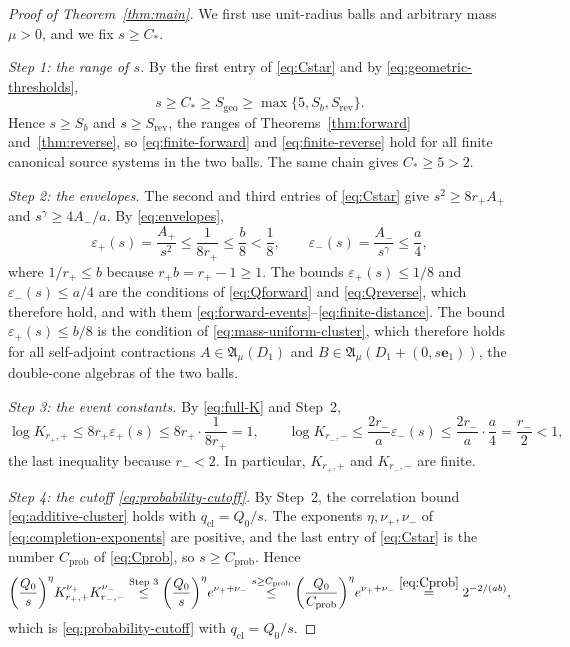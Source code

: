 \documentclass[11pt]{amsart}
\numberwithin{equation}{section}
\theoremstyle{definition}
\newcommand{\A}{\mathfrak A}
\newcommand{\eone}{\mathbf e_1}
\begin{document}
\begin{proof}[Proof of Theorem~\ref{thm:main}]
We first use unit-radius balls and arbitrary mass \(\mu>0\), and we fix
\(s\ge C_*\).

\smallskip
\emph{Step 1: the range of \(s\).} By the first entry of
\eqref{eq:Cstar} and by \eqref{eq:geometric-thresholds},
\[
 s\ge C_*\ge S_{\mathrm{geo}}\ge\max\{5,S_b,S_{\mathrm{rev}}\}.
\]
Hence \(s\ge S_b\) and \(s\ge S_{\mathrm{rev}}\), the ranges of
Theorems~\ref{thm:forward} and~\ref{thm:reverse}, so
\eqref{eq:finite-forward} and \eqref{eq:finite-reverse} hold for all
finite canonical source systems in the two balls. The same chain gives
\(C_*\ge5>2\).

\smallskip
\emph{Step 2: the envelopes.} The second and third entries of
\eqref{eq:Cstar} give \(s^2\ge8r_+A_+\) and \(s^\gamma\ge4A_-/a\). By
\eqref{eq:envelopes},
\[
 \varepsilon_+(s)=\frac{A_+}{s^2}\le\frac1{8r_+}\le\frac b8<\frac18,
 \qquad
 \varepsilon_-(s)=\frac{A_-}{s^\gamma}\le\frac a4,
\]
where \(1/r_+\le b\) because \(r_+b=r_+-1\ge1\). The bounds
\(\varepsilon_+(s)\le1/8\) and \(\varepsilon_-(s)\le a/4\) are the
conditions of \eqref{eq:Qforward} and \eqref{eq:Qreverse}, which
therefore hold, and with them
\eqref{eq:forward-events}--\eqref{eq:finite-distance}. The bound
\(\varepsilon_+(s)\le b/8\) is the condition of
\eqref{eq:mass-uniform-cluster}, which therefore holds for all
self-adjoint contractions \(A\in\A_\mu(D_1)\) and
\(B\in\A_\mu(D_1+(0,s\eone))\), the double-cone algebras of the two
balls.

\smallskip
\emph{Step 3: the event constants.} By \eqref{eq:full-K} and Step~2,
\[
 \log K_{r_+,+}\le8r_+\varepsilon_+(s)\le8r_+\cdot\frac1{8r_+}=1,
 \qquad
 \log K_{r_-,-}\le\frac{2r_-}{a}\varepsilon_-(s)
 \le\frac{2r_-}{a}\cdot\frac a4=\frac{r_-}2<1,
\]
the last inequality because \(r_-<2\). In particular, \(K_{r_+,+}\) and
\(K_{r_-,-}\) are finite.

\smallskip
\emph{Step 4: the cutoff \eqref{eq:probability-cutoff}.} By Step~2, the
correlation bound \eqref{eq:additive-cluster} holds with
\(q_{\mathrm{cl}}=Q_0/s\). The exponents \(\eta,\nu_+,\nu_-\) of
\eqref{eq:completion-exponents} are positive, and the last entry of
\eqref{eq:Cstar} is the number \(C_{\mathrm{prob}}\) of
\eqref{eq:Cprob}, so \(s\ge C_{\mathrm{prob}}\). Hence
\[
 \biggl(\frac{Q_0}{s}\biggr)^\eta
 K_{r_+,+}^{\nu_+}K_{r_-,-}^{\nu_-}
 \overset{\text{Step 3}}{\le}
 \biggl(\frac{Q_0}{s}\biggr)^\eta e^{\nu_++\nu_-}
 \overset{s\ge C_{\mathrm{prob}}}{\le}
 \biggl(\frac{Q_0}{C_{\mathrm{prob}}}\biggr)^\eta e^{\nu_++\nu_-}
 \overset{\eqref{eq:Cprob}}{=}
 2^{-2/(ab)},
\]
which is \eqref{eq:probability-cutoff} with \(q_{\mathrm{cl}}=Q_0/s\).


\end{proof}
\end{document}
